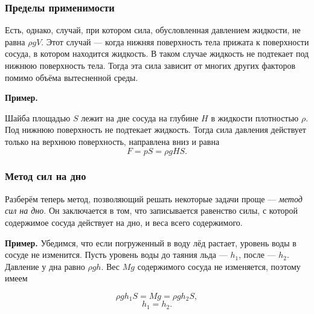 \documentclass[12pt, a4paper]{article}%
\begin{document}
\subsubsection*{Пределы применимости}

Есть, однако, случай, при котором сила, обусловленная давлением жидкости, не равна $\rho gV$. Этот случай --- когда нижняя поверхность тела прижата к поверхности сосуда, в котором находится жидкость. В таком случае жидкость не подтекает под нижнюю поверхность тела. Тогда эта сила зависит от многих других факторов помимо объёма вытесненной среды. 

\textbf{Пример.}

Шайба площадью $S$ лежит на дне сосуда на глубине $H$ в жидкости плотностью $\rho$. Под нижнюю поверхность не подтекает жидкость. Тогда сила давления действует только на верхнюю поверхность, направлена вниз и равна \[F = pS = \rho gHS.\]

\subsubsection*{Метод сил на дно}

Разберём теперь метод, позволяющий решать некоторые задачи проще --- \textit{метод сил на дно}. Он заключается в том, что записывается равенство силы,
с которой содержимое сосуда действует на дно, и веса всего содержимого. 

\textbf{Пример.}
Убедимся, что если погруженный в воду лёд растает, уровень воды в сосуде не изменится. Пусть уровень воды до таяния льда --- $h_1$, после --- $h_2$. 
Давление у дна равно $\rho gh$. Вес $Mg$ содержимого сосуда не изменяется, поэтому имеем

\[
\rho g h_1 S = Mg = \rho g h_2 S,
\]
\[h_1 = h_2.\]
\end{document}
